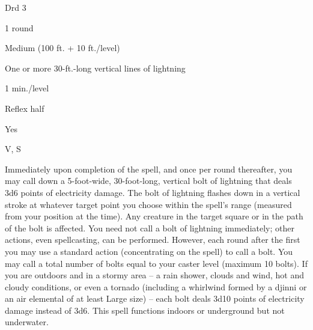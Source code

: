 
\begin{description*}
\item[Level:] Drd 3
\item[Casting Time:] 1 round
\item[Range:] Medium (100 ft. + 10 ft./level)
\item[Effect:] One or more 30-ft.-long vertical lines of lightning
\item[Duration:] 1 min./level
\item[Saving Throw:] Reflex half
\item[Spell Resistance:] Yes
\item[Components:] V, S
\end{description*}

Immediately upon completion of the spell, and once per round thereafter, you may
call down a 5-foot-wide, 30-foot-long, vertical bolt of lightning that deals 3d6
points of electricity damage. The bolt of lightning flashes down in a vertical
stroke at whatever target point you choose within the spell's range (measured from
your position at the time). Any creature in the target square or in the path of
the bolt is affected.
You need not call a bolt of lightning immediately; other actions, even spellcasting,
can be performed. However, each round after the first you may use a standard action
(concentrating on the spell) to call a bolt. You may call a total number of bolts
equal to your caster level (maximum 10 bolts).
If you are outdoors and in a stormy area -- a rain shower, clouds and wind, hot
and cloudy conditions, or even a tornado (including a whirlwind formed by a djinni
or an air elemental of at least Large size) -- each bolt deals 3d10 points of electricity
damage instead of 3d6.
This spell functions indoors or underground but not underwater.